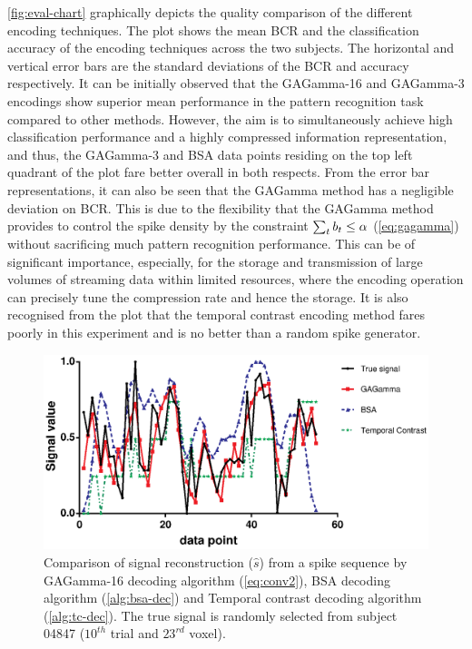 \figurename \ref{fig:eval-chart} graphically depicts the quality comparison of the different encoding techniques. The plot shows the mean BCR and the classification accuracy of the encoding techniques across the two subjects. The horizontal and vertical error bars are the standard deviations of the BCR and accuracy respectively. It can be initially observed that the GAGamma-16 and GAGamma-3 encodings show superior mean performance in the pattern recognition task compared to other methods. However, the aim is to simultaneously achieve high classification performance and a highly compressed information representation, and thus, the GAGamma-3 and BSA data points residing on the top left quadrant of the plot fare better overall in both respects. From the error bar representations, it can also be seen that the GAGamma method has a negligible deviation on BCR. This is due to the flexibility that the GAGamma method provides to control the spike density by the constraint $\everymath{\displaystyle} \sum_t b_t\leq \alpha$ (\equationname \ref{eq:gagamma}) without sacrificing much pattern recognition performance. This can be of significant importance, especially, for the storage and transmission of large volumes of streaming data within limited resources, where the encoding operation can precisely tune the compression rate and hence the storage. It is also recognised from the plot that the temporal contrast encoding method fares poorly in this experiment and is no better than a random spike generator.              

\begin{figure}
	\centering
	\includegraphics[scale=0.9]{fig/encoding/signal_recon.eps}
	\caption{Comparison of signal reconstruction ($\hat{s}$) from a spike sequence by GAGamma-16 decoding  algorithm (\equationname \ref{eq:conv2}), BSA decoding algorithm (\algorithmname \ref{alg:bsa-dec}) and Temporal contrast decoding algorithm (\algorithmname \ref{alg:tc-dec}). The true signal is randomly selected from subject 04847 ($10^{th}$ trial and $23^{rd}$ voxel).}
	\label{fig:recon}
\end{figure}


